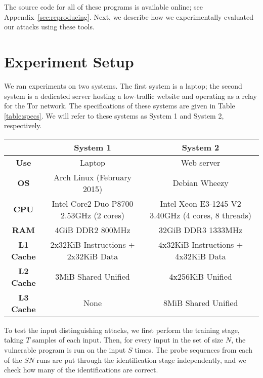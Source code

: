 \documentclass[letterpaper,twocolumn,10pt]{article}
\begin{document}
The source code for all of these programs is available online; see
Appendix~\ref{sec:reproducing}. Next, we describe how we experimentally
evaluated our attacks using these tools.

\section{Experiment Setup}
\label{sec:experimentsetup}

We ran experiments on two systems. The first system is a laptop; the second
system is a dedicated server hosting a low-traffic website and operating as
a relay for the Tor network. The specifications of these systems are given in
Table \ref{table:specs}. We will refer to these systems as System 1 and System
2, respectively.

\begin{table*}
    \centering
\begin{tabular}{|c|c|c|}
    \hline
    & \textbf{System 1} & \textbf{System 2} \\
    \hline
    \textbf{Use} & Laptop & Web server \\
    \hline
    \textbf{OS} & Arch Linux (February 2015) & Debian Wheezy \\
    \hline
    \textbf{CPU} & Intel Core2 Duo P8700 2.53GHz (2 cores) & Intel Xeon E3-1245 V2 3.40GHz (4 cores, 8 threads)  \\
    \hline
    \textbf{RAM} & 4GiB DDR2 800MHz & 32GiB DDR3 1333MHz \\
    \hline
    \textbf{L1 Cache} & 2x32KiB Instructions + 2x32KiB Data & 4x32KiB Instructions + 4x32KiB Data \\
    \hline
    \textbf{L2 Cache} & 3MiB Shared Unified & 4x256KiB Unified \\
    \hline
    \textbf{L3 Cache} & None & 8MiB Shared Unified \\
    \hline
\end{tabular}
\caption{System specifications. Cache specifications were obtained from
    \texttt{cpu-world.com}. System 1 does not have a L3
cache, but FLUSH+RELOAD works with its L2 cache as it is shared between cores.}
\label{table:specs}
\end{table*}

To test the input distinguishing attacks, we first perform the training stage,
taking $T$ samples of each input. Then, for every input in the set of size $N$,
the vulnerable program is run on the input $S$ times. The probe sequences from
each of the $SN$ runs are put through the identification stage independently,
and we check how many of the identifications are correct.
\end{document}
